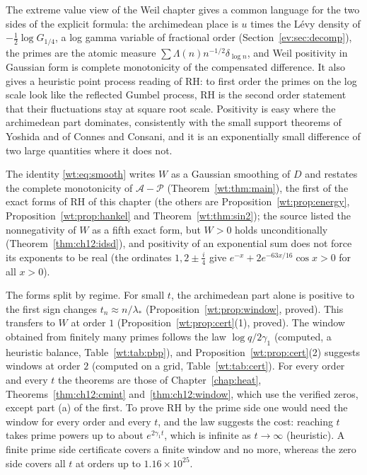 The extreme value view of the Weil chapter gives a common language for the two sides of the explicit formula: the archimedean place is $u$ times the L\'evy density of $-\frac12\log G_{1/4}$, a log gamma variable of fractional order (Section~\ref{ev:sec:decomp}), the primes are the atomic measure $\sum\Lambda(n)n^{-1/2}\delta_{\log n}$, and Weil positivity in Gaussian form is complete monotonicity of the compensated difference. It also gives a heuristic point process reading of RH: to first order the primes on the log scale look like the reflected Gumbel process, RH is the second order statement that their fluctuations stay at square root scale. Positivity is easy where the archimedean part dominates, consistently with the small support theorems of Yoshida and of Connes and Consani, and it is an exponentially small difference of two large quantities where it does not.

The identity \eqref{wt:eq:smooth} writes $W$ as a Gaussian smoothing of $D$ and restates the complete monotonicity of $\mathcal A-\mathcal P$ (Theorem~\ref{wt:thm:main}), the first of the exact forms of RH of this chapter (the others are Proposition~\ref{wt:prop:energy}, Proposition~\ref{wt:prop:hankel} and Theorem~\ref{wt:thm:sin2}); the source listed the nonnegativity of $W$ as a fifth exact form, but $W>0$ holds unconditionally (Theorem~\ref{thm:ch12:idsd}), and positivity of an exponential sum does not force its exponents to be real (the ordinates $1,2\pm\frac i4$ give $e^{-x}+2e^{-63x/16}\cos x>0$ for all $x>0$).

The forms split by regime. For small $t$, the archimedean part alone is positive to the first sign changes $t_n\approx n/\lambda_*$ (Proposition~\ref{wt:prop:window}, proved). This transfers to $W$ at order $1$ (Proposition~\ref{wt:prop:cert}(1), proved). The window obtained from finitely many primes follows the law $\log q/2\gamma_1$ (computed, a heuristic balance, Table~\ref{wt:tab:pbp}), and Proposition~\ref{wt:prop:cert}(2) suggests windows at order $2$ (computed on a grid, Table~\ref{wt:tab:cert}). For every order and every $t$ the theorems are those of Chapter~\ref{chap:heat}, Theorems~\ref{thm:ch12:cmint} and~\ref{thm:ch12:window}, which use the verified zeros, except part (a) of the first. To prove RH by the prime side one would need the window for every order and every $t$, and the law suggests the cost: reaching $t$ takes prime powers up to about $e^{2\gamma_1t}$, which is infinite as $t\to\infty$ (heuristic). A finite prime side certificate covers a finite window and no more, whereas the zero side covers all $t$ at orders up to $1.16\times10^{25}$.

